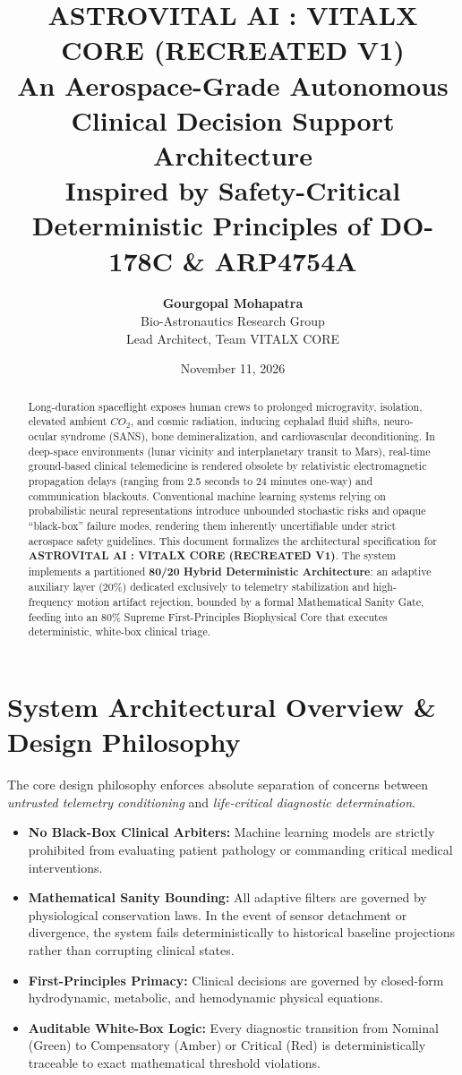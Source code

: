 \documentclass[11pt,a4paper]{article}
\title{\textbf{\LARGE ASTROVITAL AI : VITALX CORE (RECREATED V1)}\\[0.3em]
\Large An Aerospace-Grade Autonomous Clinical Decision Support Architecture\\
\large Inspired by Safety-Critical Deterministic Principles of DO-178C \& ARP4754A}
\author{\textbf{Gourgopal Mohapatra} \\ Bio-Astronautics Research Group \\ Lead Architect, Team VITALX CORE}
\date{November 11, 2026}
\begin{document}
\maketitle
\thispagestyle{fancy}

\begin{abstract}
Long-duration spaceflight exposes human crews to prolonged microgravity, isolation, elevated ambient $CO_2$, and cosmic radiation, inducing cephalad fluid shifts, neuro-ocular syndrome (SANS), bone demineralization, and cardiovascular deconditioning. In deep-space environments (lunar vicinity and interplanetary transit to Mars), real-time ground-based clinical telemedicine is rendered obsolete by relativistic electromagnetic propagation delays (ranging from 2.5 seconds to 24 minutes one-way) and communication blackouts. Conventional machine learning systems relying on probabilistic neural representations introduce unbounded stochastic risks and opaque ``black-box'' failure modes, rendering them inherently uncertifiable under strict aerospace safety guidelines. This document formalizes the architectural specification for \textbf{ASTROVITAL AI : VITALX CORE (RECREATED V1)}. The system implements a partitioned \textbf{80/20 Hybrid Deterministic Architecture}: an adaptive auxiliary layer (20\%) dedicated exclusively to telemetry stabilization and high-frequency motion artifact rejection, bounded by a formal Mathematical Sanity Gate, feeding into an 80\% Supreme First-Principles Biophysical Core that executes deterministic, white-box clinical triage.
\end{abstract}

\section{System Architectural Overview \& Design Philosophy}

The core design philosophy enforces absolute separation of concerns between \textit{untrusted telemetry conditioning} and \textit{life-critical diagnostic determination}. 

\begin{itemize}
    \item \textbf{No Black-Box Clinical Arbiters:} Machine learning models are strictly prohibited from evaluating patient pathology or commanding critical medical interventions.
    \item \textbf{Mathematical Sanity Bounding:} All adaptive filters are governed by physiological conservation laws. In the event of sensor detachment or divergence, the system fails deterministically to historical baseline projections rather than corrupting clinical states.
    \item \textbf{First-Principles Primacy:} Clinical decisions are governed by closed-form hydrodynamic, metabolic, and hemodynamic physical equations.
    \item \textbf{Auditable White-Box Logic:} Every diagnostic transition from Nominal (Green) to Compensatory (Amber) or Critical (Red) is deterministically traceable to exact mathematical threshold violations.
\end{itemize}
\end{document}
